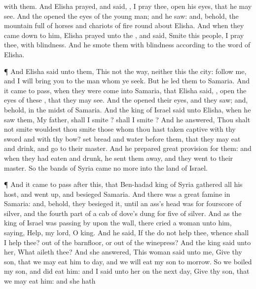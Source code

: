 {{} with them.
And
Elisha
prayed, and
said,
{}, I pray thee,
open his
eyes, that he may
see. And the
{}
opened the
eyes of the young
man; and he
saw: and, behold, the
mountain
{}
full of
horses and
chariots of
fire round
about
Elisha.
And when they came
down to him,
Elisha
prayed unto the
{}, and
said,
Smite this
people, I pray thee, with
blindness. And he
smote them with
blindness according to the
word of
Elisha.
\par }{\PP {}¶ And
Elisha
said unto them, This
{} not the
way, neither
{}
this the
city:
follow me, and I will
bring you to the
man whom ye
seek. But he
led them to
Samaria.
And it came to pass, when they were
come into
Samaria, that
Elisha
said,
{},
open the
eyes of these
{}, that they may
see. And the
{}
opened their
eyes, and they
saw; and, behold,
{} in the
midst of
Samaria.
And the
king of
Israel
said unto
Elisha, when he
saw them, My
father, shall I
smite
{}? shall I
smite
{}?
And he
answered, Thou shalt not
smite
{} wouldest thou
smite those whom thou hast taken
captive with thy
sword and with thy
bow?
set
bread and
water
before them, that they may
eat and
drink, and
go to their
master.
And he
prepared
great
provision for them: and when they had
eaten and
drunk, he sent them
away, and they
went to their
master. So the
bands of
Syria
came no
more into the
land of
Israel.
\par }{\PP {}¶ And it came to pass after
this, that
Ben-hadad
king of
Syria
gathered all his
host, and went
up, and
besieged
Samaria.
And there was a
great
famine in
Samaria: and, behold, they
besieged it, until an
ass’s
head was
{} for
fourscore
{} of
silver, and the fourth
part of a
cab of
dove’s dung for
five
{} of
silver.
And as the
king of
Israel was passing
by upon the
wall, there
cried a
woman unto him,
saying,
Help, my
lord, O
king.
And he
said, If the
{} do not
help thee,
whence shall I
help thee? out of the
barnfloor, or out of the
winepress?
And the
king
said unto her, What aileth thee? And she
answered, This
woman
said unto me,
Give thy
son, that we may
eat him to
day, and we will
eat my
son to
morrow.
So we
boiled my
son, and did
eat him: and I
said unto her on the
next
day,
Give thy
son, that we may
eat him: and she hath
}

